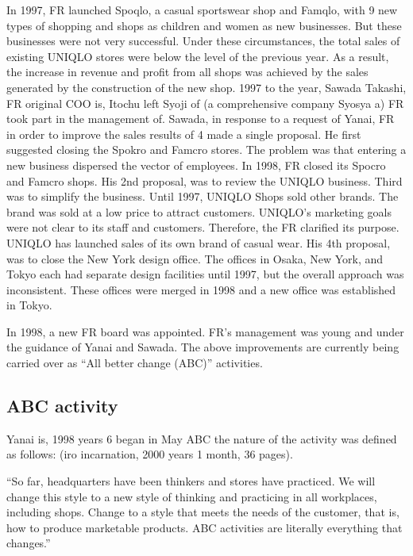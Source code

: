 \documentclass[12pt,]{article}
\begin{document}
In 1997, FR launched Spoqlo, a casual sportswear shop and Famqlo, with 9
new types of shopping and shops as children and women as new businesses.
But these businesses were not very successful. Under these
circumstances, the total sales of existing UNIQLO stores were below the
level of the previous year. As a result, the increase in revenue and
profit from all shops was achieved by the sales generated by the
construction of the new shop. 1997 to the year, Sawada Takashi, FR
original COO is, Itochu left Syoji of (a comprehensive company Syosya a)
FR took part in the management of. Sawada, in response to a request of
Yanai, FR in order to improve the sales results of 4 made a single
proposal. He first suggested closing the Spokro and Famcro stores. The
problem was that entering a new business dispersed the vector of
employees. In 1998, FR closed its Spocro and Famcro shops. His 2nd
proposal, was to review the UNIQLO business. Third was to simplify the
business. Until 1997, UNIQLO Shops sold other brands. The brand was sold
at a low price to attract customers. UNIQLO's marketing goals were not
clear to its staff and customers. Therefore, the FR clarified its
purpose. UNIQLO has launched sales of its own brand of casual wear. His
4th proposal, was to close the New York design office. The offices in
Osaka, New York, and Tokyo each had separate design facilities until
1997, but the overall approach was inconsistent. These offices were
merged in 1998 and a new office was established in Tokyo.

In 1998, a new FR board was appointed. FR's management was young and
under the guidance of Yanai and Sawada. The above improvements are
currently being carried over as ``All better change (ABC)'' activities.

\hypertarget{abc-activity}{%
\subsection{ABC activity}\label{abc-activity}}

Yanai is, 1998 years 6 began in May ABC the nature of the activity was
defined as follows: (iro incarnation, 2000 years 1 month, 36 pages).

``So far, headquarters have been thinkers and stores have practiced. We
will change this style to a new style of thinking and practicing in all
workplaces, including shops. Change to a style that meets the needs of
the customer, that is, how to produce marketable products. ABC
activities are literally everything that changes.''
\end{document}
